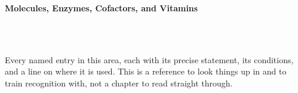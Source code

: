 



\makeindex[title={Index of This Volume},columns=2,intoc]

\begin{titlepage}\thispagestyle{empty}
\vspace*{0.14\textheight}
\noindent{\color{tiercat}\rule{\textwidth}{5pt}}\\[3pt]
\noindent{\color{bioline}\rule{\textwidth}{1pt}}\\[26pt]
\\[12pt]
\noindent\begin{minipage}{\textwidth}\raggedright
{\sffamily\bfseries\fontsize{28}{32}\selectfont\color{bioink}%
 \hyphenchar{} Molecules, Enzymes, Cofactors, and Vitamins\par}\end{minipage}\\[16pt]
\noindent{\color{biogreen}\rule{\textwidth}{1.4pt}}\\[10pt]
\noindent\begin{minipage}{\textwidth}\raggedright
{\fontsize{10.5}{14}\selectfont\color{biogreen}%
Every named entry in this area, each with its precise statement, its conditions, and a line on
where it is used. This is a reference to look things up in and to train recognition with, not a
chapter to read straight through.\par}\end{minipage}
\vfill
\noindent{\color{bioline}\rule{\textwidth}{1pt}}\\[3pt]
\noindent{\color{tiercat}\rule{\textwidth}{5pt}}
\end{titlepage}
\tableofcontents
\clearpage
{}
\clearpage
\printindex


